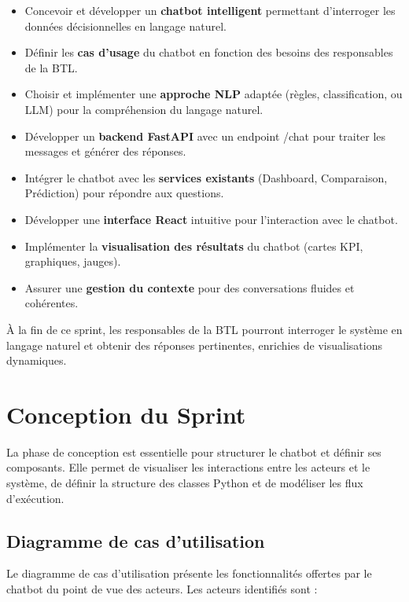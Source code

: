 \begin{itemize}
    \item Concevoir et développer un \textbf{chatbot intelligent} permettant d'interroger les données décisionnelles en langage naturel.
    \item Définir les \textbf{cas d'usage} du chatbot en fonction des besoins des responsables de la BTL.
    \item Choisir et implémenter une \textbf{approche NLP} adaptée (règles, classification, ou LLM) pour la compréhension du langage naturel.
    \item Développer un \textbf{backend FastAPI} avec un endpoint /chat pour traiter les messages et générer des réponses.
    \item Intégrer le chatbot avec les \textbf{services existants} (Dashboard, Comparaison, Prédiction) pour répondre aux questions.
    \item Développer une \textbf{interface React} intuitive pour l'interaction avec le chatbot.
    \item Implémenter la \textbf{visualisation des résultats} du chatbot (cartes KPI, graphiques, jauges).
    \item Assurer une \textbf{gestion du contexte} pour des conversations fluides et cohérentes.
\end{itemize}

À la fin de ce sprint, les responsables de la BTL pourront interroger le système en langage naturel et obtenir des réponses pertinentes, enrichies de visualisations dynamiques.

\section{Conception du Sprint}
\label{sec:sprint6-conception}

La phase de conception est essentielle pour structurer le chatbot et définir ses composants. Elle permet de visualiser les interactions entre les acteurs et le système, de définir la structure des classes Python et de modéliser les flux d'exécution.

\subsection{Diagramme de cas d'utilisation}
\label{subsec:sprint6-use-case}

Le diagramme de cas d'utilisation présente les fonctionnalités offertes par le chatbot du point de vue des acteurs. Les acteurs identifiés sont :

